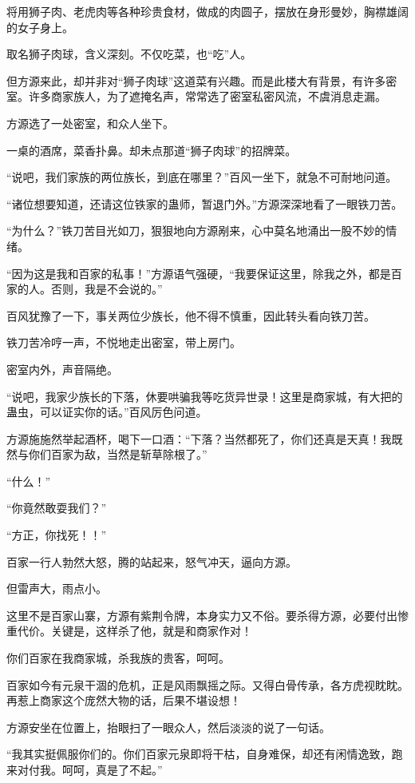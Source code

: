 \begin{this_body}
将用狮子肉、老虎肉等各种珍贵食材，做成的肉圆子，摆放在身形曼妙，胸襟雄阔的女子身上。

取名狮子肉球，含义深刻。不仅吃菜，也“吃”人。

但方源来此，却并非对“狮子肉球”这道菜有兴趣。而是此楼大有背景，有许多密室。许多商家族人，为了遮掩名声，常常选了密室私密风流，不虞消息走漏。

方源选了一处密室，和众人坐下。

一桌的酒席，菜香扑鼻。却未点那道“狮子肉球”的招牌菜。

“说吧，我们家族的两位族长，到底在哪里？”百风一坐下，就急不可耐地问道。

“诸位想要知道，还请这位铁家的蛊师，暂退门外。”方源深深地看了一眼铁刀苦。

“为什么？”铁刀苦目光如刀，狠狠地向方源剐来，心中莫名地涌出一股不妙的情绪。

“因为这是我和百家的私事！”方源语气强硬，“我要保证这里，除我之外，都是百家的人。否则，我是不会说的。”

百风犹豫了一下，事关两位少族长，他不得不慎重，因此转头看向铁刀苦。

铁刀苦冷哼一声，不悦地走出密室，带上房门。

密室内外，声音隔绝。

“说吧，我家少族长的下落，休要哄骗我等吃货异世录！这里是商家城，有大把的蛊虫，可以证实你的话。”百风厉色问道。

方源施施然举起酒杯，喝下一口酒：“下落？当然都死了，你们还真是天真！我既然与你们百家为敌，当然是斩草除根了。”

“什么！”

“你竟然敢耍我们？”

“方正，你找死！！”

百家一行人勃然大怒，腾的站起来，怒气冲天，逼向方源。

但雷声大，雨点小。

这里不是百家山寨，方源有紫荆令牌，本身实力又不俗。要杀得方源，必要付出惨重代价。关键是，这样杀了他，就是和商家作对！

你们百家在我商家城，杀我族的贵客，呵呵。

百家如今有元泉干涸的危机，正是风雨飘摇之际。又得白骨传承，各方虎视眈眈。再惹上商家这个庞然大物的话，后果不堪设想！

方源安坐在位置上，抬眼扫了一眼众人，然后淡淡的说了一句话。

“我其实挺佩服你们的。你们百家元泉即将干枯，自身难保，却还有闲情逸致，跑来对付我。呵呵，真是了不起。”


\end{this_body}
